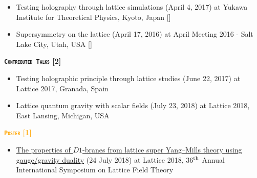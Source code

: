 \begin{itemize}
 \item Testing holography through lattice simulations (April 4, 2017) at Yukawa Institute for Theoretical Physics, Kyoto, Japan
  [\texttt{\textbf{}}]  
 \vspace{1mm} 
 
 
\item Supersymmetry on the lattice (April 17, 2016) at April Meeting 2016 - Salt Lake City, Utah, USA 
 [\texttt{\textbf{}}] 
\end{itemize}



\textcolor{bittersweet}{\textbf{\textsc{\fontsize{10}{38} \bfseries \texttt{Contributed Talks} [2]}}}
\begin{itemize}
  \item Testing holographic principle through lattice studies (June 22, 2017) at Lattice 2017, Granada, Spain \vspace{1mm} 
  \item Lattice quantum gravity with scalar fields (July 23, 2018) at Lattice 2018, East Lansing, Michigan, USA   
\end{itemize}
 

\textcolor{orange}{\textbf{\textsc{\fontsize{10}{38} \bfseries \texttt{Poster} [1]}}}
  \begin{itemize}
 \item \href{https://indico.fnal.gov/event/15949/session/4/contribution/66}{The properties of $D1$-branes from lattice super Yang--Mills theory using gauge/gravity duality} (24 July 2018) 
 at Lattice 2018, 36$^{\rm{th}}$ Annual International Symposium on Lattice Field Theory
\end{itemize}
